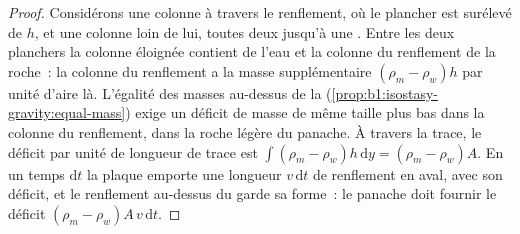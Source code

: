 \begin{proof}
Considérons une colonne à travers le renflement, où le plancher est surélevé de $h$, et une
colonne loin de lui, toutes deux jusqu'à une . Entre les deux planchers
la colonne éloignée contient de l'eau et la colonne du renflement de la roche~: la colonne du renflement a la
masse supplémentaire $(\rho_m - \rho_w)h$ par unité d'aire là. L'égalité des masses au-dessus de la
 (\cref{prop:b1:isostasy-gravity:equal-mass}) exige un
déficit de masse de même taille plus bas dans la colonne du renflement, dans la roche
légère du panache. À travers la trace, le déficit par unité de longueur de trace est
$\int(\rho_m - \rho_w)h\,\mathrm dy = (\rho_m - \rho_w)A$. En un temps
$\mathrm dt$ la plaque emporte une longueur $v\,\mathrm dt$ de renflement en aval,
avec son déficit, et le renflement au-dessus du  garde sa forme~: le panache
doit fournir le déficit $(\rho_m - \rho_w)A\,v\,\mathrm dt$.
\end{proof}

